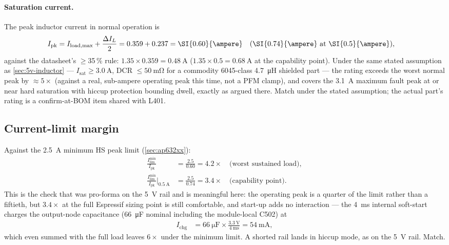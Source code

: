 \paragraph{Saturation current.} The peak inductor current in normal operation is
\begin{align*}
  I_{\mathrm{pk}} &= I_{\mathrm{load,max}} + \frac{\Delta I_L}{2}
    = 0.359 + 0.237 = \SI{0.60}{\ampere}
  \quad (\SI{0.74}{\ampere}\ \text{at \SI{0.5}{\ampere}}),
\end{align*}
against the datasheet's $\geq$35\,\% rule: $1.35 \times 0.359 = \SI{0.48}{\ampere}$
($1.35 \times 0.5 = \SI{0.68}{\ampere}$ at the capability point). Under the same
stated assumption as \cref{sec:5v-inductor} --- $I_{\mathrm{sat}} \geq \SI{3.0}{\ampere}$,
DCR $\leq\SI{50}{\milli\ohm}$ for a commodity 6045-class \SI{4.7}{\micro\henry} shielded
part --- the rating exceeds the worst normal peak by $\approx 5\times$ (against a real,
sub-ampere operating peak this time, not a PFM clamp), and covers the
\SI{3.1}{\ampere} maximum fault peak at or near hard saturation with hiccup protection
bounding dwell, exactly as argued there. Match under the stated assumption; the actual
part's rating is a confirm-at-BOM item shared with L401.

\subsection{Current-limit margin}\label{sec:3v3-ilim}

Against the \SI{2.5}{\ampere} minimum HS peak limit (\cref{sec:ap632xx}):
\begin{align*}
  \frac{I_{\mathrm{lim}}^{\min}}{I_{\mathrm{pk}}} &= \frac{2.5}{0.60} = 4.2\times
  \quad\text{(worst sustained load)}, \\
  \frac{I_{\mathrm{lim}}^{\min}}{I_{\mathrm{pk}}}\bigg|_{\SI{0.5}{\ampere}}
    &= \frac{2.5}{0.74} = 3.4\times
  \quad\text{(capability point)}.
\end{align*}
This is the check that was pro-forma on the 5~V rail and is meaningful here: the
operating peak is a quarter of the limit rather than a fiftieth, but $3.4\times$ at the
full Espressif sizing point is still comfortable, and start-up adds no interaction ---
the \SI{4}{\milli\second} internal soft-start charges the output-node capacitance
(\SI{66}{\micro\farad} nominal including the module-local C502) at
\begin{align*}
  I_{\mathrm{chg}} &= \SI{66}{\micro\farad} \times
    \frac{\SI{3.3}{\volt}}{\SI{4}{\milli\second}} = \SI{54}{\milli\ampere},
\end{align*}
which even summed with the full load leaves $6\times$ under the minimum limit. A shorted
rail lands in hiccup mode, as on the 5~V rail. Match.

